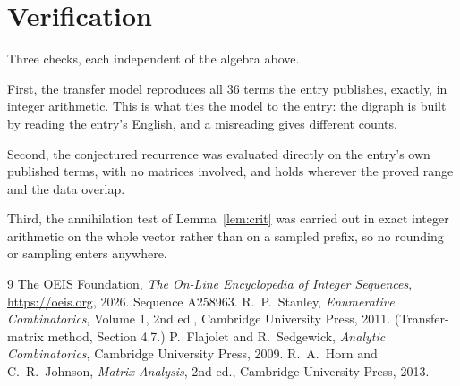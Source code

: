 \documentclass[11pt,a4paper]{article}
\theoremstyle{plain}
\theoremstyle{definition}
\begin{document}
\section{Verification}

Three checks, each independent of the algebra above.

First, the transfer model reproduces all $36$ terms the entry publishes, exactly, in
integer arithmetic. This is what ties the model to the entry: the digraph is built by reading
the entry's English, and a misreading gives different counts.

Second, the conjectured recurrence was evaluated directly on the entry's own published terms,
with no matrices involved, and holds wherever the proved range and the data overlap.

Third, the annihilation test of Lemma~\ref{lem:crit} was carried out in exact integer
arithmetic on the whole vector rather than on a sampled prefix, so no rounding or sampling
enters anywhere.

\begin{thebibliography}{9}
 The OEIS Foundation, \emph{The On-Line Encyclopedia of Integer
Sequences}, \url{https://oeis.org}, 2026. Sequence A258963.
 R.~P.~Stanley, \emph{Enumerative Combinatorics}, Volume 1, 2nd ed.,
Cambridge University Press, 2011. (Transfer-matrix method, Section 4.7.)
 P.~Flajolet and R.~Sedgewick, \emph{Analytic Combinatorics}, Cambridge
University Press, 2009.
 R.~A.~Horn and C.~R.~Johnson, \emph{Matrix Analysis}, 2nd ed., Cambridge
University Press, 2013.
\end{thebibliography}
\end{document}

